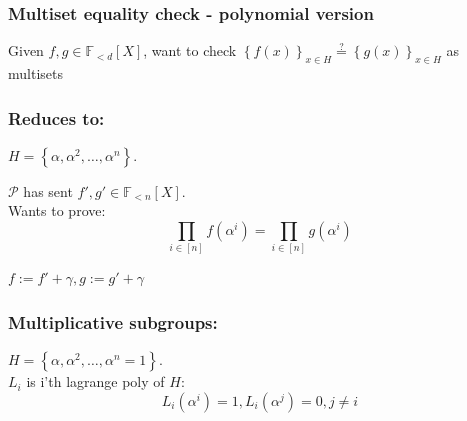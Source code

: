 \documentclass[shadesubsections,compress,14pt,mathserif]{beamer}
\newcommand{\F}{\ensuremath{\mathbb F}}
\newcommand{\set}[1]{\ensuremath{\left\{#1\right\}}}
\newcommand{\sett}[2]{\ensuremath{\left\{#1\right\}_{#2}}}
\newcommand{\defeq}{\ensuremath{:=}}
\newcommand{\prv}{\ensuremath{\mathcal{P}}}
\newcommand{\polysofdeg}[1]{\F_{< #1}[X]}
\newcommand{\gen}{\alpha}
\begin{document}
\begin{frame}
\frametitle{Multiset equality check - polynomial version}
Given $f,g\in \polysofdeg{d}$, want to check $\sett{f(x)}{x\in H} \stackrel{?}{=} \sett{g(x)}{x\in H}$ as multisets \\ 
 
\end{frame}
\begin{frame}
\frametitle{Reduces to:}   %
 $H=\set{\gen,\gen^2,\ldots,\gen^n}$.\\
 \vspace{0.2in}
 
 $\prv$ has sent $f',g'\in \polysofdeg{n}$.\\
 \vspace{0.2in}
 Wants to prove:
 \[\prod_{i\in [n]}  f(\gen^i) = \prod_{i\in [n]} g(\gen^i)\]

 $f\defeq f' +\gamma,g\defeq g'+\gamma$

\end{frame}

\begin{frame}
\frametitle{Multiplicative subgroups:}   %
 $H=\set{\gen,\gen^2,\ldots,\gen^n=1}$.\\
 \vspace{0.2in}
 $L_i$ is i'th lagrange poly of $H$:
 \[L_i(\alpha^i)=1,L_i(\alpha^j) =0, j\neq i\]
\end{frame}
\end{document}
